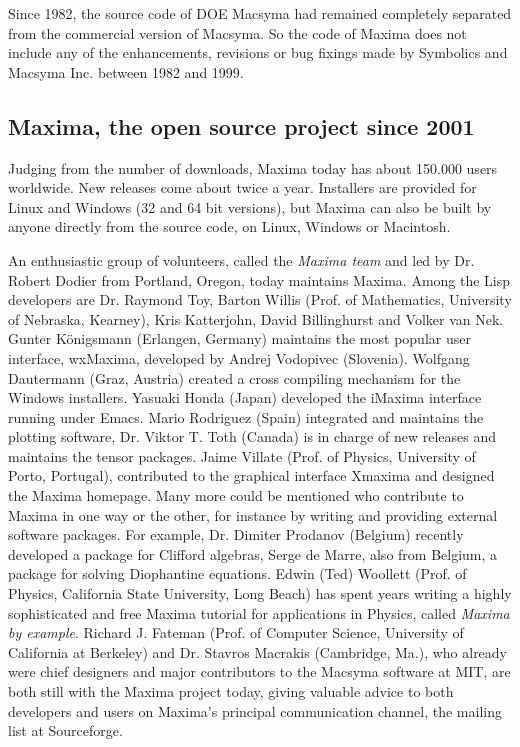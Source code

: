 \documentclass[../Maxima_Workbook.tex]{subfiles}
\begin{document}
\lz Since 1982, the source code of DOE Macsyma had remained completely separated from the commercial version of Macsyma. So the code of Maxima does not include any of the enhancements, revisions or bug fixings made by Symbolics and Macsyma Inc. between 1982 and 1999.

\subsection{Maxima, the open source project since 2001}

Judging from the number of downloads, Maxima today has about 150.000 users worldwide. New releases come about twice a year. Installers are provided for Linux and Windows (32 and 64 bit versions), but Maxima can also be built by anyone directly from the source code, on Linux, Windows or Macintosh. 

\lz An enthusiastic group of volunteers, called the \emph{Maxima team} and led by Dr. Robert Dodier from Portland, Oregon, today maintains Maxima. Among the Lisp developers are Dr. Raymond Toy, Barton Willis (Prof. of Mathematics, University of Nebraska, Kearney), Kris Katterjohn, David Billinghurst and Volker van Nek. Gunter Königsmann (Erlangen, Germany) maintains the most popular user interface, wxMaxima, developed by Andrej Vodopivec (Slovenia). Wolfgang Dautermann (Graz, Austria) created a cross compiling mechanism for the Windows installers. Yasuaki Honda (Japan) developed the iMaxima interface running under Emacs. Mario Rodriguez (Spain) integrated and maintains the plotting software, Dr. Viktor T. Toth (Canada) is in charge of new releases and maintains the tensor packages. Jaime Villate (Prof. of Physics, University of Porto, Portugal), contributed to the graphical interface Xmaxima and designed the Maxima homepage. Many more could be mentioned who contribute to Maxima in one way or the other, for instance by writing and providing external software packages. For example, Dr. Dimiter Prodanov (Belgium) recently developed a package for Clifford algebras, Serge de Marre, also from Belgium, a package for solving Diophantine equations. Edwin (Ted) Woollett (Prof. of Physics, California State University, Long Beach) has spent years writing a highly sophisticated and free Maxima tutorial for applications in Physics, called \emph{Maxima by example}. Richard J. Fateman (Prof. of Computer Science, University of California at Berkeley) and Dr. Stavros Macrakis (Cambridge, Ma.), who already were chief designers and major contributors to the Macsyma software at MIT, are both still with the Maxima project today, giving valuable advice to both developers and users on Maxima's principal communication channel, the mailing list at Sourceforge.
\end{document}
